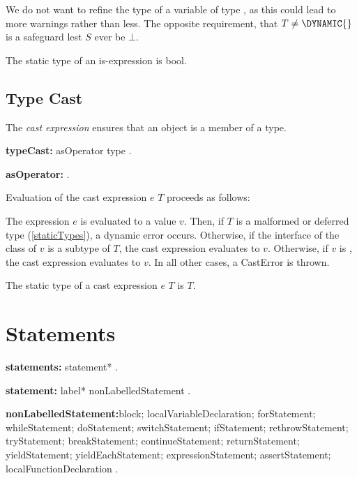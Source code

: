 \documentclass{article}
\newcommand{\code}[1]{{\sf #1}}
\begin{document}
\begin{itemize}
{We do not want to refine the type of a variable of type \DYNAMIC{}, as this could lead to more warnings rather than less.  The opposite requirement, that $T \ne \DYNAMIC{}$ is a safeguard lest $S$ ever be $\bot$.
}

\LMHash{}
The static type of an is-expression is \code{bool}.


\subsection{ Type Cast}

\LMHash{}
The {\em cast expression} ensures that an object is a member of a type.

 \begin{grammar}
 {\bf typeCast:}
 asOperator type
 .


{\bf asOperator:}
\AS{}
    .
 \end{grammar}

\LMHash{}
 Evaluation of the cast expression \code{$e$ \AS{} $T$} proceeds as follows:

\LMHash{}
The expression $e$ is evaluated to a value $v$. Then, if $T$ is a malformed or deferred type (\ref{staticTypes}), a dynamic error occurs. Otherwise, if the interface of the class of $v$ is a subtype of $T$, the cast expression evaluates to $v$. Otherwise, if $v$ is \NULL{}, the cast expression evaluates to $v$.
In all other cases,  a \code{CastError} is thrown.

\LMHash{}
The static type of a cast expression  \code{$e$ \AS{} $T$}  is $T$.


\section{Statements}

 \begin{grammar}
{\bf statements:}
      statement*
    .


{\bf statement:}
      label* nonLabelledStatement
    .

{\bf nonLabelledStatement:}block;
      localVariableDeclaration;
      forStatement;
      whileStatement;
      doStatement;
      switchStatement;
      ifStatement;
      rethrowStatement;
      tryStatement;
      breakStatement;
      continueStatement;
      returnStatement;
      yieldStatement;
      yieldEachStatement;
      expressionStatement;
      assertStatement;
      localFunctionDeclaration
    .
 \end{grammar}


\end{itemize}
\end{document}

